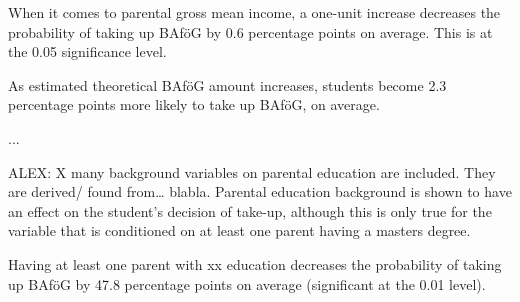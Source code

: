When it comes to parental gross mean income, a one-unit increase decreases the probability of taking up BAföG by 0.6 percentage points on average. This is at the 0.05 significance level.

As estimated theoretical BAföG amount increases, students become 2.3 percentage points more likely to take up BAföG, on average.

...

ALEX: X many background variables on parental education are included. They are derived/ found from… blabla.
Parental education background is shown to have an effect on the student’s decision of take-up, although this is only true for the variable that is conditioned on at least one parent having a masters degree.

Having at least one parent with xx education decreases the probability of taking up BAföG by 47.8 percentage points on average (significant at the 0.01 level).




